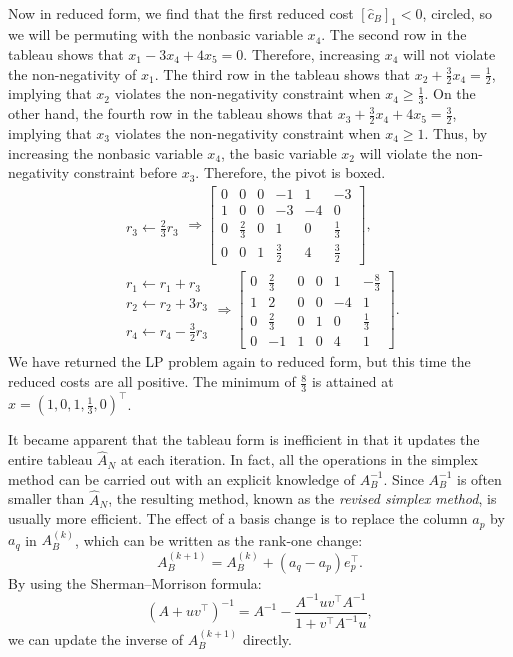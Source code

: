 \begin{example}
\begin{align*}
\end{align*}
Now in reduced form, we find that the first reduced cost $[\hat{c}_B]_1<0$, circled, so we will be permuting with the nonbasic variable $x_4$. The second row in the tableau shows that $x_1 -3x_4 + 4x_5=0$. Therefore, increasing $x_4$ will not violate the non-negativity of $x_1$. The third row in the tableau shows that $x_2+\tfrac{3}{2}x_4 = \tfrac{1}{2}$, implying that $x_2$ violates the non-negativity constraint when $x_4\ge\tfrac{1}{3}$. On the other hand, the fourth row in the tableau shows that $x_3+\tfrac{3}{2}x_4+4x_5 = \tfrac{3}{2}$, implying that $x_3$ violates the non-negativity constraint when $x_4\ge1$. Thus, by increasing the nonbasic variable $x_4$, the basic variable $x_2$ will violate the non-negativity constraint before $x_3$. Therefore, the pivot is boxed.
\begin{align*}
\begin{array}{c} ~\\r_3 \leftarrow \tfrac{2}{3}r_3\end{array} \Rightarrow \left[\begin{array}{ccccc|c} 0 & 0 & 0 & -1 & 1 & -3\\\hline 1 & 0 & 0 & -3 & -4 & 0\\ 0 & \tfrac{2}{3} & 0 & 1 & 0 & \tfrac{1}{3}\\ 0 & 0 & 1 & \tfrac{3}{2} & 4 & \tfrac{3}{2}\end{array}\right],\\
\begin{array}{c} r_1\leftarrow r_1+r_3\\r_2\leftarrow r_2 + 3r_3\\~\\r_4\leftarrow r_4-\tfrac{3}{2}r_3\end{array} \Rightarrow \left[\begin{array}{ccccc|c} 0 & \tfrac{2}{3} & 0 & 0 & 1 & -\tfrac{8}{3}\\\hline 1 & 2 & 0 & 0 & -4 & 1\\ 0 & \tfrac{2}{3} & 0 & 1 & 0 & \tfrac{1}{3}\\ 0 & -1 & 1 & 0 & 4 & 1\end{array}\right].
\end{align*}
We have returned the LP problem again to reduced form, but this time the reduced costs are all positive. The minimum of $\tfrac{8}{3}$ is attained at $x = (1,0,1,\tfrac{1}{3},0)^\top$.
\end{example}

It became apparent that the tableau form is inefficient in that it updates the entire tableau $\hat{A}_N$ at each iteration. In fact, all the operations in the simplex method can be carried out with an explicit knowledge of $A_B^{-1}$. Since $A_B^{-1}$ is often smaller than $\hat{A}_N$, the resulting method, known as the {\em revised simplex method}, is usually more efficient. The effect of a basis change is to replace the column $a_p$ by $a_q$ in $A_B^{(k)}$, which can be written as the rank-one change:
\[
A_B^{(k+1)} = A_B^{(k)} + (a_q-a_p)e_p^\top.
\]
By using the Sherman--Morrison formula:
\[
\left(A+uv^\top\right)^{-1} = A^{-1} - \dfrac{A^{-1}uv^\top A^{-1}}{1+v^\top A^{-1}u},
\]
we can update the inverse of $A_B^{(k+1)}$ directly.


